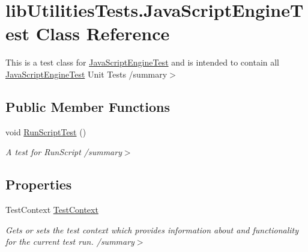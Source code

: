 \hypertarget{classlib_utilities_tests_1_1_java_script_engine_test}{\section{lib\+Utilities\+Tests.\+Java\+Script\+Engine\+Test Class Reference}
\label{classlib_utilities_tests_1_1_java_script_engine_test}
}


This is a test class for \hyperlink{classlib_utilities_tests_1_1_java_script_engine_test}{Java\+Script\+Engine\+Test} and is intended to contain all \hyperlink{classlib_utilities_tests_1_1_java_script_engine_test}{Java\+Script\+Engine\+Test} Unit Tests /summary$>$  


\subsection*{Public Member Functions}
\begin{DoxyCompactItemize}
\item 
\hypertarget{classlib_utilities_tests_1_1_java_script_engine_test_adbfd21a027dd997a0fc9ea2ff6e3e1c1}{void \hyperlink{classlib_utilities_tests_1_1_java_script_engine_test_adbfd21a027dd997a0fc9ea2ff6e3e1c1}{Run\+Script\+Test} ()}\label{classlib_utilities_tests_1_1_java_script_engine_test_adbfd21a027dd997a0fc9ea2ff6e3e1c1}

\begin{DoxyCompactList}\small\item\em A test for Run\+Script /summary$>$ \end{DoxyCompactList}\end{DoxyCompactItemize}
\subsection*{Properties}
\begin{DoxyCompactItemize}
\item 
\hypertarget{classlib_utilities_tests_1_1_java_script_engine_test_a740fd765ba72a96a39ea2d32b7319c43}{Test\+Context \hyperlink{classlib_utilities_tests_1_1_java_script_engine_test_a740fd765ba72a96a39ea2d32b7319c43}{Test\+Context}}\label{classlib_utilities_tests_1_1_java_script_engine_test_a740fd765ba72a96a39ea2d32b7319c43}

\begin{DoxyCompactList}\small\item\em Gets or sets the test context which provides information about and functionality for the current test run. /summary$>$ \end{DoxyCompactList}\end{DoxyCompactItemize}


